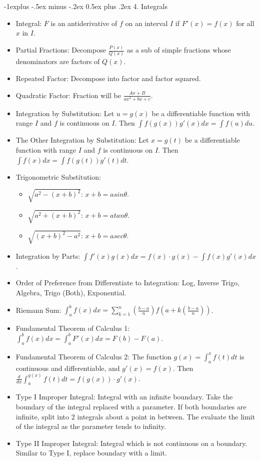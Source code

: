 \documentclass[10pt, portrait]{article}
\makeatletter
\renewcommand{\section}{\@startsection{section}{1}{0mm}%
                                {-1ex plus -.5ex minus -.2ex}%
                                {0.5ex plus .2ex}%
                                {\normalfont\large\bfseries}}
\renewcommand{\section}{\@startsection{section}{2}{0mm}%
                                {-1explus -.5ex minus -.2ex}%
                                {0.5ex plus .2ex}%
                                {\normalfont\normalsize\bfseries}}
\makeatother
\begin{document}
\begin{multicols*}{2}
\section{4. Integrals}
\begin{itemize}
    \item Integral: $F$ is an antiderivative of $f$ on an interval $I$ if $F'(x)=f(x)$ for all $x$ in $I$.
    \item Partial Fractions: Decompose $\frac{P(x)}{Q(x)}$ as a sub of simple fractions whose denominators are factors of $Q(x)$.
    \item Repeated Factor: Decompose into factor and factor squared.
    \item Quadratic Factor: Fraction will be $\frac{Ax+B}{ax^2+bx+c}$.
    \item Integration by Substitution: Let $u=g(x)$ be a differentiable function with range $I$ and $f$ is continuous on $I$. Then $\int f(g(x))g'(x)dx=\int f(u)du$.
    \item The Other Integration by Substitution: Let $x=g(t)$ be a differentiable function with range $I$ and $f$ is continuous on $I$. Then $\int f(x)dx=\int f(g(t))g'(t)dt$.
    \item Trigonometric Substitution:
    \begin{itemize}
        \item $\sqrt{a^2-(x+b)^2}$: $x+b=a sin\theta$.
        \item $\sqrt{a^2+(x+b)^2}$: $x+b=a tan\theta$.
        \item $\sqrt{(x+b)^2-a^2}$: $x+b=a sec\theta$.
    \end{itemize}
    \item Integration by Parts: $\int f'(x)g(x)dx=f(x)\cdot g(x)-\int f(x)g'(x)dx$.
    \item Order of Preference from Differentiate to Integration: Log, Inverse Trigo, Algebra, Trigo (Both), Exponential.
    \item Riemann Sum: $\int_a^bf(x)dx=\sum_{k=1}^n(\frac{b-a}{n})f(a+k(\frac{b-a}{n}))$.
    \item Fundamental Theorem of Calculus 1: $\int_a^bf(x)dx=\int_a^bF'(x)dx=F(b)-F(a)$.
    \item Fundamental Theorem of Calculus 2: The function $g(x)=\int_a^xf(t)dt$ is continuous and differentiable, and $g'(x)=f(x)$. Then $\frac{d}{dx}\int_a^{g(x)}f(t)dt=f(g(x))\cdot g'(x)$.
    \item Type I Improper Integral: Integral with an infinite boundary. Take the boundary of the integral replaced with a parameter. If both boundaries are infinite, split into 2 integrals about a point in between. The evaluate the limit of the integral as the parameter tends to infinity.
    \item Type II Improper Integral: Integral which is not continuous on a boundary. Similar to Type I, replace boundary with a limit.
\end{itemize}


\end{multicols*}
\end{document}
